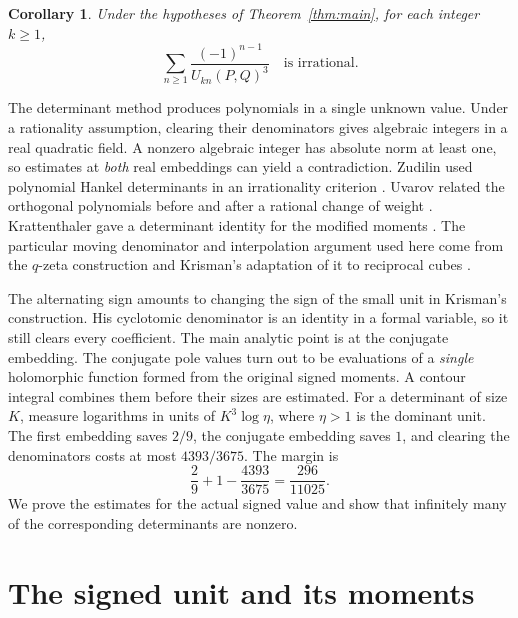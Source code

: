 \documentclass[11pt,letterpaper]{article}
\newtheorem{corollary}[theorem]{Corollary}
\numberwithin{equation}{section}
\begin{document}
\begin{corollary}\label{cor:stride}
Under the hypotheses of Theorem~\ref{thm:main}, for each integer \(k\ge1\),
\[
                  \sum_{n\ge1}\frac{(-1)^{n-1}}{U_{kn}(P,Q)^3}
                  \quad\text{is irrational}.
\]
\end{corollary}
The determinant method produces polynomials in a single unknown value.
Under a rationality assumption, clearing their denominators gives
algebraic integers in a real quadratic field. A nonzero algebraic
integer has absolute norm at least one, so estimates at \emph{both}
real embeddings can yield a contradiction. Zudilin used polynomial
Hankel determinants in an irrationality criterion
\cite[Proposition~2]{Zudilin}. Uvarov related the orthogonal polynomials
before and after a rational change of weight \cite[\S1]{Uvarov}.
Krattenthaler gave a determinant identity for the modified moments
\cite[Theorem~1]{Kratt}.
The particular moving denominator and interpolation argument used here
come from the \(q\)-zeta construction \cite[Sections~2 and~5]{QZeta}
and Krisman's adaptation of it to reciprocal cubes \cite{KFib,KLucas}.

The alternating sign amounts to changing the sign of the small unit in
Krisman's construction. His cyclotomic denominator is an identity in a
formal variable, so it still clears every coefficient. The main analytic
point is at the conjugate embedding. The conjugate pole values turn out
to be evaluations of a \emph{single} holomorphic function formed from the
original signed moments. A contour integral combines them before their
sizes are estimated. For a determinant of size \(K\), measure logarithms
in units of \(K^3\log\eta\), where \(\eta>1\) is the dominant unit.
The first embedding saves \(2/9\), the conjugate embedding saves \(1\),
and clearing the denominators costs at most \(4393/3675\). The margin is
\begin{equation}\label{eq:margin}
                    \frac29+1-\frac{4393}{3675}=\frac{296}{11025}.
\end{equation}
We prove the estimates for the actual signed value and show that
infinitely many of the corresponding determinants are nonzero.

\section{The signed unit and its moments}\label{sec:moments}
\end{document}
